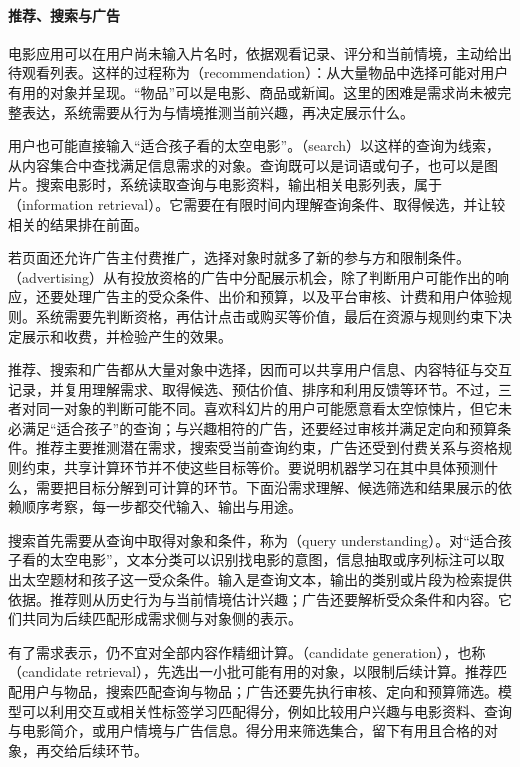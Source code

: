 \paragraph{推荐、搜索与广告}
电影应用可以在用户尚未输入片名时，依据观看记录、评分和当前情境，主动给出待观看列表。这样的过程称为（recommendation）：从大量物品中选择可能对用户有用的对象并呈现。“物品”可以是电影、商品或新闻。这里的困难是需求尚未被完整表达，系统需要从行为与情境推测当前兴趣，再决定展示什么。

用户也可能直接输入“适合孩子看的太空电影”。（search）以这样的查询为线索，从内容集合中查找满足信息需求的对象。查询既可以是词语或句子，也可以是图片。搜索电影时，系统读取查询与电影资料，输出相关电影列表，属于（information retrieval）。它需要在有限时间内理解查询条件、取得候选，并让较相关的结果排在前面。

若页面还允许广告主付费推广，选择对象时就多了新的参与方和限制条件。（advertising）从有投放资格的广告中分配展示机会，除了判断用户可能作出的响应，还要处理广告主的受众条件、出价和预算，以及平台审核、计费和用户体验规则。系统需要先判断资格，再估计点击或购买等价值，最后在资源与规则约束下决定展示和收费，并检验产生的效果。

推荐、搜索和广告都从大量对象中选择，因而可以共享用户信息、内容特征与交互记录，并复用理解需求、取得候选、预估价值、排序和利用反馈等环节。不过，三者对同一对象的判断可能不同。喜欢科幻片的用户可能愿意看太空惊悚片，但它未必满足“适合孩子”的查询；与兴趣相符的广告，还要经过审核并满足定向和预算条件。推荐主要推测潜在需求，搜索受当前查询约束，广告还受到付费关系与资格规则约束，共享计算环节并不使这些目标等价。要说明机器学习在其中具体预测什么，需要把目标分解到可计算的环节。下面沿需求理解、候选筛选和结果展示的依赖顺序考察，每一步都交代输入、输出与用途。

搜索首先需要从查询中取得对象和条件，称为（query understanding）。对“适合孩子看的太空电影”，文本分类可以识别找电影的意图，信息抽取或序列标注可以取出太空题材和孩子这一受众条件。输入是查询文本，输出的类别或片段为检索提供依据。推荐则从历史行为与当前情境估计兴趣；广告还要解析受众条件和内容。它们共同为后续匹配形成需求侧与对象侧的表示。

有了需求表示，仍不宜对全部内容作精细计算。（candidate generation），也称（candidate retrieval），先选出一小批可能有用的对象，以限制后续计算。推荐匹配用户与物品，搜索匹配查询与物品；广告还要先执行审核、定向和预算筛选。模型可以利用交互或相关性标签学习匹配得分，例如比较用户兴趣与电影资料、查询与电影简介，或用户情境与广告信息。得分用来筛选集合，留下有用且合格的对象，再交给后续环节。

